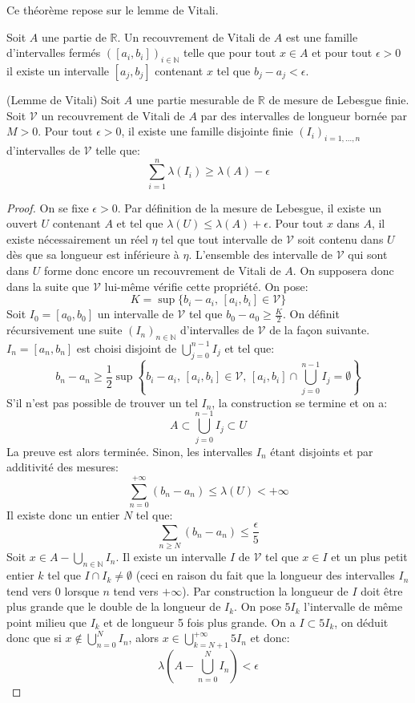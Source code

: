 Ce théorème  repose sur le lemme de Vitali.
\begin{defn}
Soit $A$ une partie de $\mathbb{R}$. Un recouvrement de Vitali de $A$ est une
famille d'intervalles fermés $([a_i,b_i])_{i \in \mathbb{N}}$ telle que pour
tout $x \in A$ et pour tout $\epsilon > 0$ il existe un intervalle $[a_j,b_j]$
contenant $x$ tel que $b_j-a_j < \epsilon$.
\end{defn}
\begin{lemme}{(Lemme de Vitali)}
Soit $A$ une partie mesurable de $\mathbb{R}$ de mesure de Lebesgue finie. Soit
$\mathcal{V}$ un recouvrement de Vitali de $A$ par des intervalles de longueur
bornée par $M >0$. Pour tout $\epsilon > 0$, il existe une famille disjointe
finie $(I_i)_{i=1, \dots, n}$ d'intervalles de $\mathcal{V}$ telle que:
\[
\sum_{i=1}^n \lambda(I_i) \geq \lambda(A) - \epsilon
\]
\end{lemme}
\begin{proof}
On se fixe $\epsilon > 0$. 
Par définition de la mesure de Lebesgue, il existe un ouvert $U$ contenant $A$
et tel que $\lambda(U) \leq \lambda(A) + \epsilon$. Pour tout $x$ dans $A$, il
existe nécessairement un réel $\eta$ tel que tout intervalle de $\mathcal{V}$
soit contenu dans $U$ dès que sa longueur est inférieure à $\eta$. L'ensemble
des intervalle de $\mathcal{V}$ qui sont dans $U$ forme donc encore un
recouvrement de Vitali de $A$. On supposera donc dans la suite que $\mathcal{V}$
lui-même vérifie cette propriété.
 On pose:
\[
K =  \sup\{ b_i-a_i, \, [a_i,b_i]\in
\mathcal{V}\}
\]
 Soit $I_0 = [a_0,b_0]$ un intervalle de $\mathcal{V}$ tel que
$b_0 - a_0 \geq \frac{K}{2}$. On définit récursivement une suite $(I_n)_{n \in
\mathbb{N}}$ d'intervalles de $\mathcal{V}$ de la façon suivante.
$I_n=[a_n,b_n]$ est choisi disjoint de $\bigcup_{j=0}^{n-1} I_j$ et tel que:
\[
b_n - a_n \geq \frac{1}{2}\sup\left\{  b_i-a_i, \, [a_i,b_i]\in
\mathcal{V}, \, [a_i,b_i] \cap \bigcup_{j=0}^{n-1} I_j = \emptyset \right\}
\]
S'il n'est pas possible de trouver un tel $I_n$, la construction se termine et
on a:
\[
A \subset \bigcup_{j=0}^{n-1} I_j \subset U
\]
La preuve est alors terminée. 
Sinon, les intervalles $I_n$ étant disjoints et par additivité des mesures:
\[
\sum_{n=0}^{+\infty} (b_n-a_n) \leq \lambda(U) < +\infty
\]
Il existe donc un entier $N$ tel que:
\[
\sum_{n \geq N} (b_n-a_n) \leq \frac{\epsilon}{5}
\]
Soit $x \in A - \bigcup_{n \in \mathbb{N}} I_n$. Il existe un intervalle $I$ de
$\mathcal{V}$ tel que $x \in I$ et un plus petit entier $k$ tel que $I \cap I_k
\neq \emptyset$ (ceci en raison du fait que la longueur des intervalles $I_n$
tend vers 0 lorsque $n$ tend vers $+\infty$). Par construction la longueur de
$I$ doit être plus grande que le double de la longueur de $I_k$. On pose $5I_k$
l'intervalle de même point milieu que $I_k$ et de longueur 5 fois plus grande.
On a $I \subset 5I_k$, on déduit donc que si $x \notin \bigcup_{n=0}^N I_n$,
alors $x \in  \bigcup_{k=N+1}^{+\infty} 5I_n$ et donc:
\[
\lambda\left(A - \bigcup_{n=0}^N I_n \right) <  \epsilon
\]
\end{proof}
